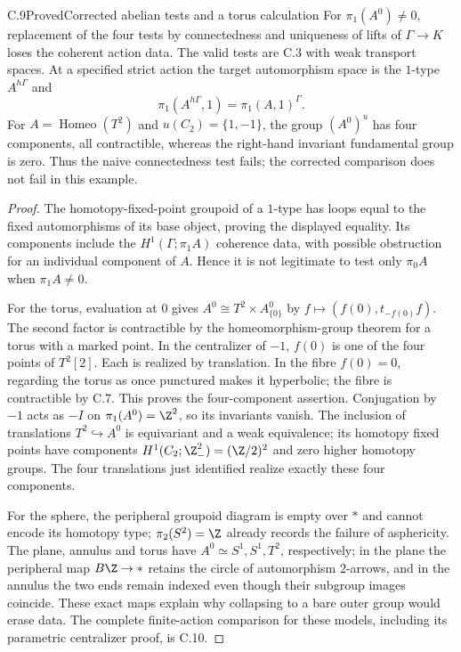 \begin{claim}{C.9}{Proved}{Corrected abelian tests and a torus calculation}
For $\pi_1(A^0)\ne0$, replacement of the four tests by connectedness and
uniqueness of lifts of $\Gamma\to K$ loses the coherent action data.
The valid tests are C.3 with weak transport spaces. At a specified
strict action the target automorphism space is the $1$-type
$A^{h\Gamma}$ and
\[
 \pi_1(A^{h\Gamma},1)=\pi_1(A,1)^\Gamma.
\]
For $A=\operatorname{Homeo}(T^2)$ and $u(C_2)=\{1,-1\}$, the group
$(A^0)^u$ has four components, all contractible, whereas the right-hand
invariant fundamental group is zero. Thus the naive connectedness test
fails; the corrected comparison does not fail in this example.
\end{claim}
\begin{proof}
The homotopy-fixed-point groupoid of a $1$-type has loops equal to the
fixed automorphisms of its base object, proving the displayed equality.
Its components include the $H^1(\Gamma;\pi_1A)$ coherence data, with
possible obstruction for an individual component of $A$. Hence it is
not legitimate to test only $\pi_0A$ when $\pi_1A\ne0$.

For the torus, evaluation at $0$ gives
$A^0\cong T^2\times A^0_{\{0\}}$ by
$f\mapsto(f(0),t_{-f(0)}f)$. The second factor is contractible by the
homeomorphism-group theorem for a torus with a marked point. In the
centralizer of $-1$, $f(0)$ is one of the four points of $T^2[2]$.
Each is realized by translation. In the fibre $f(0)=0$, regarding the
torus as once punctured makes it hyperbolic; the fibre is contractible
by C.7. This proves the four-component assertion. Conjugation by $-1$
acts as $-I$ on $\pi_1(A^0)=\Z^2$, so its invariants vanish.
The inclusion of translations $T^2\hookrightarrow A^0$ is equivariant
and a weak equivalence; its homotopy fixed points have components
$H^1(C_2;\Z^2_{-})=(\Z/2)^2$ and zero higher homotopy groups. The four
translations just identified realize exactly these four components.

For the sphere, the peripheral groupoid diagram is empty over $*$ and
cannot encode its homotopy type; $\pi_2(S^2)=\Z$ already records the
failure of asphericity. The plane, annulus and torus have
$A^0\simeq S^1,S^1,T^2$, respectively; in the plane the peripheral
map $B\Z\to *$ retains the circle of automorphism $2$-arrows, and in the
annulus the two ends remain indexed even though their subgroup images
coincide. These exact maps explain why collapsing to a bare outer group
would erase data. The complete finite-action comparison for these models, including
its parametric centralizer proof, is C.10.
\end{proof}


